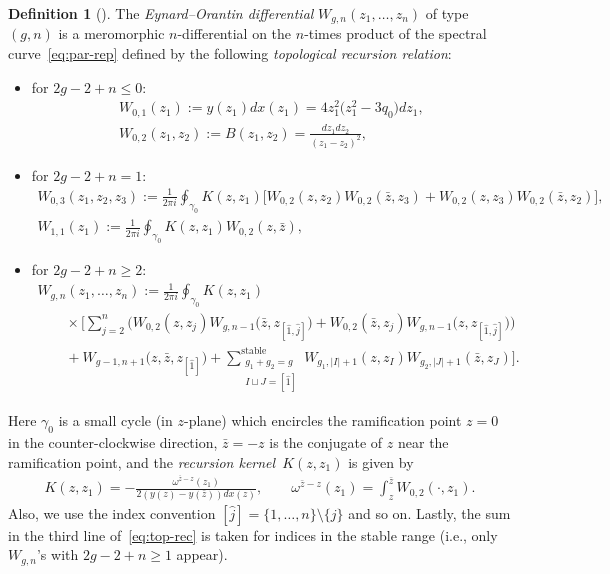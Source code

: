 \documentclass[11pt]{article}
\theoremstyle{definition}
\newtheorem{Def}[thm]{Definition}
\numberwithin{equation}{section}
\begin{document}
\begin{Def}[]
The {\em Eynard--Orantin differential}
$W_{g,n}(z_{1},\dots,z_{n})$ of type $(g,n)$
is a meromorphic $n$-dif\/ferential on the $n$-times product
of the spectral curve~\eqref{eq:par-rep} def\/ined by
the following {\em topological recursion relation}:
\begin{itemize}\itemsep=0pt
\item
for $2g-2+n \le 0$:
\begin{gather*}
W_{0,1}(z_{1})   :=   y(z_{1}) dx(z_{1})  = 4z_{1}^{2} \big(z_{1}^{2}-3q_{0}\big)dz_{1}  , \\
W_{0,2}(z_{1},z_{2})   :=   B(z_1, z_2)   = \frac{dz_{1}dz_{2}}{(z_{1}-z_{2})^{2}} ,
\end{gather*}
\item %
for $2g-2+n = 1$:
\begin{gather*}
W_{0,3}(z_{1},z_{2},z_{3})   :=   \frac{1}{2\pi i}
\oint_{\gamma_{0}} K(z,z_{1}) \big[ W_{0,2}(z,z_{2}) W_{0,2}(\bar{z},z_{3})
+ W_{0,2}(z,z_{3}) W_{0,2}(\bar{z},z_{2}) \big], \\
W_{1,1}(z_{1})   :=   \frac{1}{2\pi i}
\oint_{\gamma_{0}} K(z,z_{1}) W_{0,2}(z,\bar{z}),
\end{gather*}
\item %
for $2g-2+n \ge 2$:
\begin{gather}
W_{g,n}(z_{1},\dots,z_{n}) := \frac{1}{2\pi i}
\oint_{\gamma_{0}} K(z,z_{1})   \nonumber \\
 \qquad{}\times  \Biggl[ \sum_{j=2}^{n}
\big( W_{0,2}(z,z_{j}) W_{g,n-1}\big(\bar{z}, z_{[\hat{1},\hat{j}]}\big) +
W_{0,2}(\bar{z},z_{j}) W_{g,n-1}\big(z, z_{[\hat{1},\hat{j}]}\big) \big) \nonumber \\
\qquad{}+ W_{g-1,n+1}\big(z,\bar{z},z_{[\hat{1}]}\big) +
\sum_{\substack{g_{1}+g_{2}=g \\ I \sqcup J = [\hat{1}]}}^{\text{stable}}
W_{g_{1}, |I|+1}(z,z_{I}) W_{g_{2}, |J|+1}(\bar{z}, z_{J}) \Biggr].\label{eq:top-rec}
\end{gather}
\end{itemize}
Here $\gamma_{0}$ is a small cycle (in $z$-plane) which encircles
the ramif\/ication point $z=0$ in the counter-clockwise direction,
$\bar{z} = - z$ is the conjugate of $z$ near the ramif\/ication point,
and the {\em recursion kernel}~$K(z,z_{1})$ is given by
\begin{gather*} %
K(z,z_{1}) = - \frac{\omega^{\bar{z}-z}(z_{1})}{2(y(z) - y(\bar{z}))dx(z)}, \qquad
\omega^{\bar{z}-z}(z_{1}) = \int^{\bar{z}}_{z} W_{0,2}( \cdot, z_{1}).
\end{gather*}
Also, we use the index convention
$[\hat{j}] = \{1, \dots, n \}{\setminus}\{j\}$ and so on.
Lastly, the sum in the third line of~\eqref{eq:top-rec} is taken
for indices in the stable range
(i.e., only $W_{g,n}$'s with $2g - 2 + n \ge 1$ appear).
\end{Def}
\end{document}
